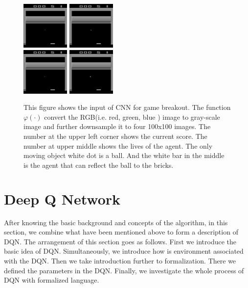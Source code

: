 \documentclass{article}
\begin{document}
\begin{figure}[h!]
\centering
{\includegraphics[width = 0.21\textwidth]{test_input_0}} 
{\includegraphics[width = 0.21\textwidth]{test_input_1}}\\ 
{\includegraphics[width = 0.21\textwidth]{test_input_2}}
{\includegraphics[width = 0.21\textwidth]{test_input_3}} 
\caption{This figure shows the input of CNN for game breakout. The function $\varphi(\cdot)$ convert the RGB(i.e. red, green, blue ) image to gray-scale image and further downsample it to four 100x100 images. The number at the upper left corner shows the current score. The number at upper middle shows the lives of the agent. The only moving object white dot is a ball. And the white bar in the middle is the agent that can reflect the ball to the bricks.}\label{function_output}
\end{figure}

\section{Deep Q Network}

After knowing the basic background and concepts of the algorithm, in this section, we combine what have been mentioned above to form a description of DQN. The arrangement of this section goes as follows. First we introduce the basic idea of DQN. Simultaneously, we introduce how is environment associated with the DQN. Then we take introduction further to formalization. There we defined the parameters in the DQN. Finally, we investigate the whole process of DQN with formalized language.
\end{document}

